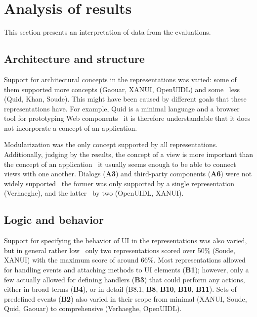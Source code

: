 \section{Analysis of results}\label{sec:analysis-of-results}
This section presents an interpretation of data from the evaluations.


\subsection{Architecture and structure}\label{subsec:4-2-architecture-and-structure}
Support for architectural concepts in the representations was varied: some of them supported more concepts (Gaouar, XANUI, OpenUIDL) and some \textendash\ less (Quid, Khan, Soude).
This might have been caused by different goals that these representations have.
For example, Quid is a minimal language and a browser tool for prototyping Web components \textendash\ it is therefore understandable that it does not incorporate a concept of an application.

Modularization was the only concept supported by all representations.
Additionally, judging by the results, the concept of a view is more important than the concept of an application \textendash\ it usually seems enough to be able to connect views with one another.
Dialogs (\textbf{A3}) and third-party components (\textbf{A6}) were not widely supported \textendash\ the former was only supported by a single representation (Verhaeghe), and the latter \textendash\ by two (OpenUIDL, XANUI).

\subsection{Logic and behavior}\label{subsec:4-2-logic-and-behavior}
Support for specifying the behavior of UI in the representations was also varied, but in general rather low \textendash\ only two representations scored over 50\% (Soude, XANUI) with the maximum score of around 66\%.
Most representations allowed for handling events and attaching methods to UI elements (\textbf{B1});
however, only a few actually allowed for defining handlers (\textbf{B3}) that could perform any actions, either in broad terms (\textbf{B4}), or in detail (B8.1, \textbf{B8}, \textbf{B10}, \textbf{B10}, \textbf{B11}).
Sets of predefined events (\textbf{B2}) also varied in their scope from minimal (XANUI, Soude, Quid, Gaouar) to comprehensive (Verhaeghe, OpenUIDL).

